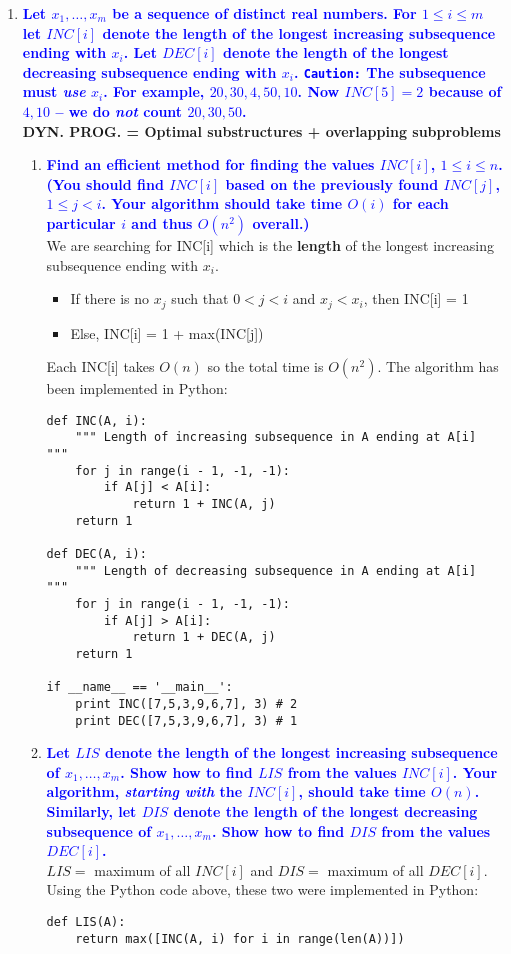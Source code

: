 \documentclass[11pt]{article}
\begin{document}
\begin{enumerate}
    
\item \textbf{\textcolor{blue}{Let $x_1,\ldots,x_m$ be a sequence of distinct real numbers. For $1\leq i\leq m$ let $INC[i]$ denote the length of the longest
increasing subsequence ending with $x_i$.  Let $DEC[i]$ denote the 
length of the longest decreasing subsequence ending with $x_i$.  
{\tt Caution:} The subsequence must {\em use} $x_i$.  For example,
$20,30,4,50, 10$.  Now $INC[5]=2$ because of $4,10$ -- we do
{\em not} count $20,30,50$.}}
    \\ \textbf{DYN. PROG. = Optimal substructures + overlapping subproblems}
    \begin{enumerate}
    \item \textbf{\textcolor{blue}{Find an efficient method for finding the values $INC[i]$, $1\leq i\leq n$. (You should find $INC[i]$ based on the previously found $INC[j]$, $1\leq j< i$.  Your algorithm should take time $O(i)$ for each
    particular $i$ and thus $O(n^2)$ overall.)}}
        \\ We are searching for INC[i] which is the \textbf{length} of the longest increasing subsequence ending with $x_i$.
        \begin{itemize}
            \item If there is no $x_j$ such that $0 < j < i$ and $x_j < x_i$, then INC[i] = 1
            \item Else, INC[i] = 1 + max(INC[j])
        \end{itemize}
        Each INC[i] takes $O(n)$ so the total time is $O(n^2)$. The algorithm has been implemented in Python:
        \begin{verbatim}
def INC(A, i):
    """ Length of increasing subsequence in A ending at A[i] """
    for j in range(i - 1, -1, -1):
        if A[j] < A[i]:
            return 1 + INC(A, j)
    return 1

def DEC(A, i):
    """ Length of decreasing subsequence in A ending at A[i] """
    for j in range(i - 1, -1, -1):
        if A[j] > A[i]:
            return 1 + DEC(A, j)
    return 1

if __name__ == '__main__':
    print INC([7,5,3,9,6,7], 3) # 2
    print DEC([7,5,3,9,6,7], 3) # 1
        \end{verbatim}

    \item \textbf{\textcolor{blue}{Let $LIS$ denote the length of the longest increasing subsequence of $x_1,\ldots,x_m$.  Show how to find $LIS$ from
    the values $INC[i]$. Your algorithm, {\em starting with} the $INC[i]$,
    should take time $O(n)$. Similarly, let $DIS$ denote the length of the longest
    decreasing subsequence of $x_1,\ldots,x_m$.  Show how to find $DIS$ from
    the values $DEC[i]$. }}
        \\ $LIS =$ maximum of all $INC[i]$ and $DIS =$ maximum of all $DEC[i]$.
        \\ Using the Python code above, these two were implemented in Python:
        \begin{verbatim}
def LIS(A):
    return max([INC(A, i) for i in range(len(A))])


\end{verbatim}
\end{enumerate}
\end{enumerate}
\end{document}
